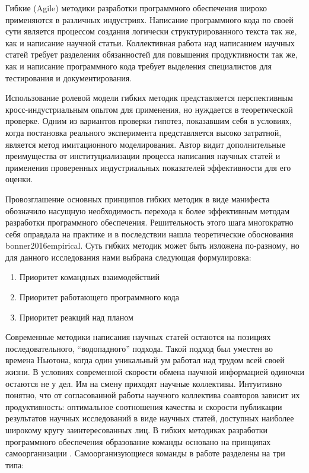 Гибкие (Agile) методики разработки программного обеспечения широко применяются в различных индустриях. 
Написание программного кода по своей сути является процессом создания логически структурированного текста так же, как и написание научной статьи. 
Коллективная работа над написанием научных статей требует разделения обязанностей для повышения продуктивности так же, как и написание программного кода требует выделения специалистов для тестирования и документирования.

Использование ролевой модели гибких методик представляется перспективным кросс-индустриальным опытом для применения, но нуждается в теоретической проверке. Одним из вариантов проверки гипотез, показавшим себя в условиях, когда постановка реального эксперимента представляется высоко затратной, является метод имитационного моделирования. 
Автор видит дополнительные преимущества от институциализации процесса написания научных статей и применения проверенных индустриальных показателей эффективности для его оценки.

Провозглашение основных принципов гибких методик в виде манифеста \cite{fowler2001agile} обозначило насущную необходимость перехода к более эффективным методам разработки программного обеспечения. 
Решительность этого шага многократно себя оправдала на практике и в последствии нашла теоретические обоснования {bonner2016empirical}. 
Суть гибких методик может быть изложена по-разному, но для данного исследования нами выбрана следующая формулировка:

\begin{enumerate}
\tightlist
\item Приоритет командных взаимодействий
\item Приоритет работающего программного кода
\item Приоритет реакций над планом
\end{enumerate}

Современные методики написания научных статей остаются на позициях последовательного, ``водопадного'' подхода.
Такой подход был уместен во времена Ньютона, когда один уникальный ум работал над трудом всей своей жизни.
В условиях современной скорости обмена научной информацией одиночки остаются не у дел.
Им на смену приходят научные коллективы.
Интуитивно понятно, что от согласованной работы научного коллектива соавторов зависит их продуктивность: оптимальное соотношения качества и скорости публикации результатов научных исследований в виде научных статей, доступных наиболее широкому кругу заинтересованных лиц. 
В гибких методиках разработки программного обеспечения образование команды основано на принципах самоорганизации \cite{hoda2016multi,moe2008understanding}.
Самоорганизующиеся команды  в работе \cite{moe2009overcoming} разделены на три типа:

